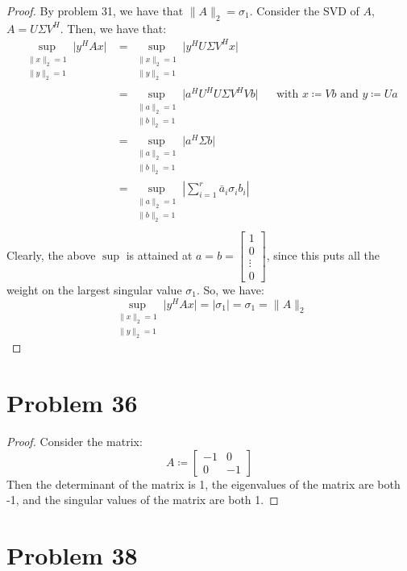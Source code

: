 \documentclass{article}
\begin{document}
\begin{proof}
By problem 31, we have that $\|A\|_2 = \sigma_1$. Consider the SVD of $A$, $A = U\Sigma V^H$. Then, we have that:
\begin{align*}
\sup\limits_{\substack{\|x\|_{2}=1 \\ \|y\|_{2}=1}} \lvert y^{H}Ax \rvert &= \sup\limits_{\substack{\|x\|_{2}=1 \\ \|y\|_{2}=1}} \lvert y^{H}U\Sigma V^Hx \rvert \\
&= \sup\limits_{\substack{\|a\|_{2}=1 \\ \|b\|_{2}=1}} \lvert a^{H}U^{H}U\Sigma V^HVb \rvert &&\text{with $x \coloneqq Vb$ and $y \coloneqq Ua$} \\
&= \sup\limits_{\substack{\|a\|_{2}=1 \\ \|b\|_{2}=1}} \lvert a^{H}\Sigma b \rvert \\
&= \sup\limits_{\substack{\|a\|_{2}=1 \\ \|b\|_{2}=1}} \left\lvert \sum\limits_{i = 1}^r \bar a_{i}\sigma_{i}b_{i} \right\rvert \\
\end{align*}
Clearly, the above $\sup$ is attained at $a = b = \begin{bmatrix} 1 \\ 0 \\ \vdots \\ 0 \end{bmatrix}$, since this puts all the weight on the largest singular value $\sigma_1$. So, we have:
$$\sup\limits_{\substack{\|x\|_{2}=1 \\ \|y\|_{2}=1}} \lvert y^{H}Ax \rvert = \lvert \sigma_1 \rvert = \sigma_1 = \|A\|_2$$
\end{proof}


\section*{Problem 36}

\begin{proof}
Consider the matrix:
$$A \coloneqq \begin{bmatrix} -1 & 0 \\ 0 & -1 \end{bmatrix}$$
Then the determinant of the matrix is 1, the eigenvalues of the matrix are both -1, and the singular values of the matrix are both 1.
\end{proof}

\section*{Problem 38}
\end{document}
